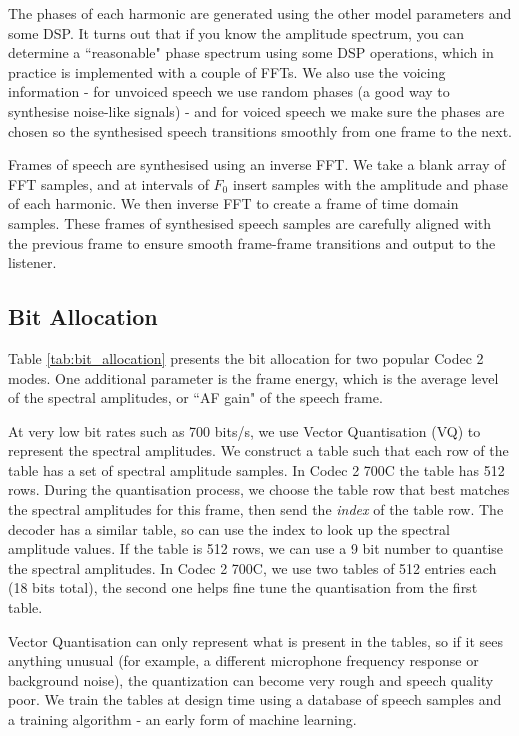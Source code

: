 \documentclass{article}
\begin{document}
{The phases of each harmonic are generated using the other model parameters and some DSP.  It turns out that if you know the amplitude spectrum, you can determine a ``reasonable" phase spectrum using some DSP operations, which in practice is implemented with a couple of FFTs.  We also use the voicing information - for unvoiced speech we use random phases (a good way to synthesise noise-like signals) - and for voiced speech we make sure the phases are chosen so the synthesised speech transitions smoothly from one frame to the next.

Frames of speech are synthesised using an inverse FFT.  We take a blank array of FFT samples, and at intervals of $F_0$ insert samples with the amplitude and phase of each harmonic.  We then inverse FFT to create a frame of time domain samples.  These frames of synthesised speech samples are carefully aligned with the previous frame to ensure smooth frame-frame transitions and output to the listener.

\subsection{Bit Allocation}

Table \ref{tab:bit_allocation} presents the bit allocation for two popular Codec 2 modes.  One additional parameter is the frame energy, which is the average level of the spectral amplitudes, or ``AF gain" of the speech frame.

At very low bit rates such as 700 bits/s, we use Vector Quantisation (VQ) to represent the spectral amplitudes.  We construct a table such that each row of the table has a set of spectral amplitude samples.  In Codec 2 700C the table has 512 rows.  During the quantisation process, we choose the table row that best matches the spectral amplitudes for this frame, then send the \emph{index} of the table row.  The decoder has a similar table, so can use the index to look up the spectral amplitude values.  If the table is 512 rows, we can use a 9 bit number to quantise the spectral amplitudes.  In Codec 2 700C, we use two tables of 512 entries each (18 bits total), the second one helps fine tune the quantisation from the first table.

Vector Quantisation can only represent what is present in the tables, so if it sees anything unusual (for example, a different microphone frequency response or background noise), the quantization can become very rough and speech quality poor.  We train the tables at design time using a database of speech samples and a training algorithm - an early form of machine learning.

}
\end{document}
